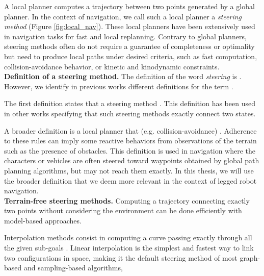
A local planner computes a trajectory between two points generated by a global planner.
In the context of navigation, we call such a local planner a \textit{steering method} (Figure \ref{fig:local_nav}). 
These local planners have been extensively used in navigation tasks for fast and local replanning.
Contrary to global planners, steering methods often do not require a guarantee of completeness or optimality but need to produce local paths under desired criteria, such as fast computation, collision-avoidance behavior, or kinetic and kinodynamic constraints.\\


\noindent\textbf{Definition of a steering method.}
The definition of the word \textit{steering} is .
However, we identify in previous works different definitions for the term .

The first definition states that a steering method  \cite{randomized_kino_planning_lavalle_2001}. 
This definition has been used in other works \cite{DIMT, move3d_lamiraux_2001} specifying that such steering methods exactly connect two states.

A broader definition is a local planner that  (e.g. collision-avoidance) \cite{van_toll_crowd_sim_2012}. 
Adherence to these rules can imply some reactive behaviors from observations of the terrain such as the presence of obstacles. %
This definition is used in navigation \cite{ondrej_pettre_steering_vision_2010,prm_rl_2019} where the characters or vehicles are often steered toward waypoints obtained by global path planning algorithms, but may not reach them exactly. 
In this thesis, we will use the broader definition that we deem more relevant in the context of legged robot navigation.\\


\noindent\textbf{Terrain-free steering methods.}
Computing a trajectory connecting exactly two points without considering the environment can be done efficiently with model-based approaches.

Interpolation methods consist in computing a curve passing exactly through all the given sub-goals \cite{interpolation_methods_bourke_1999}. Linear interpolation is the simplest and fastest way to link two configurations in space, making it the default steering method of most graph-based and sampling-based algorithms, %

